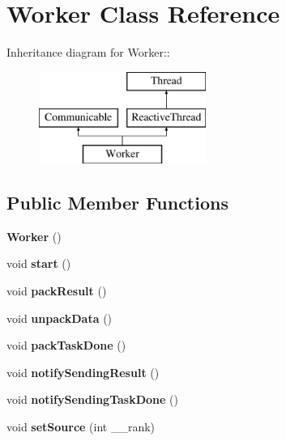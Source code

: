 \section{Worker Class Reference}
\label{class_worker}
Inheritance diagram for Worker::\begin{figure}[H]
\begin{center}
\leavevmode
\includegraphics[height=3cm]{class_worker}
\end{center}
\end{figure}
\subsection*{Public Member Functions}
\begin{CompactItemize}
\item 
{\bf Worker} ()\label{class_worker_3754817df06ffe220f7f0d903c78ccac}

\item 
void {\bf start} ()\label{class_worker_abcbbace05c6113f1959c494b3577291}

\item 
void {\bf pack\-Result} ()\label{class_worker_83780920118e6c2b67d9477bdf8be248}

\item 
void {\bf unpack\-Data} ()\label{class_worker_bff2bdcd64fe5400156cc78704c64953}

\item 
void {\bf pack\-Task\-Done} ()\label{class_worker_60d2e8eba85b9ef403d94be54c391640}

\item 
void {\bf notify\-Sending\-Result} ()\label{class_worker_e2f487014766a73c5788bdcfd58ad863}

\item 
void {\bf notify\-Sending\-Task\-Done} ()\label{class_worker_13efd6a8e275745329a4a8e23a0eb0bb}

\item 
void {\bf set\-Source} (int \_\-\_\-rank)\label{class_worker_5dab4ea663546b5a49d9398d7a624d27}

\end{CompactItemize}

